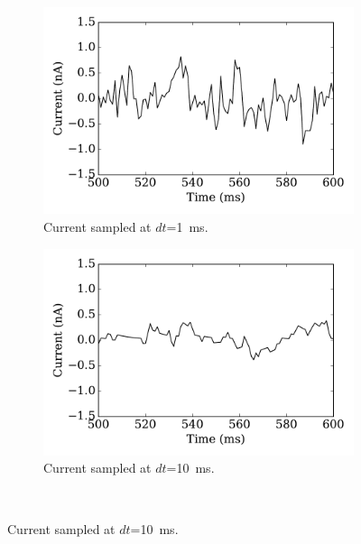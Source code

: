 	\begin{figure}[tbp!]
		\centering
		  \par
		\begin{subfigure}[t]{0.43\textwidth}
			\includegraphics[width=\textwidth]{pics_iconip/curr_tau1.pdf}
			\caption{Current sampled at $dt$=1~ms.}
		\end{subfigure}
		\begin{subfigure}[t]{0.43\textwidth}
			\includegraphics[width=\textwidth]{pics_iconip/curr_tau10.pdf}
			\caption{Current sampled at $dt$=10~ms.}
		\end{subfigure}\\

\end{figure}

